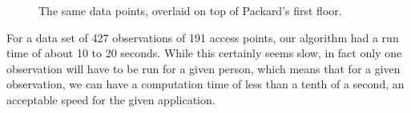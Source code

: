 \begin{figure}
\caption{The same data points, overlaid on top of Packard's first floor.}
\end{figure}
For a data set of 427 observations of 191 access points, our algorithm
had a run time of about 10 to 20 seconds. While this certainly seems slow,
in fact only one observation will have to be run for a given person, which 
means that for a given observation, we can have a computation time of less than a
tenth of a second, an acceptable speed for the given application.
